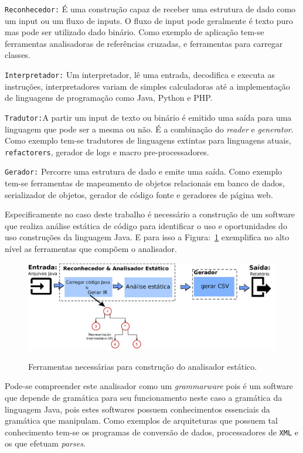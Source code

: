 \texttt{Reconhecedor:} É uma construç\~{a}o capaz de receber uma estrutura de dado como um input ou um fluxo de inputs. O fluxo de input pode geralmente \'{e} texto puro mas pode ser utilizado dado bin\'{a}rio. Como exemplo de aplicaç\~{a}o tem-se ferramentas analisadoras de referências cruzadas, e ferramentas para carregar classes.

\texttt{Interpretador:} Um interpretador, lê uma entrada, decodifica e executa as instruç\~{o}es, interpretadores variam de simples calculadoras at\'{e} a implementaç\~{a}o de linguagens de programaç\~{a}o como Java, Python e PHP.

\texttt{Tradutor:}A partir um input de texto ou bin\'{a}rio \'{e} emitido uma sa\'{i}da para uma linguagem que pode ser a mesma ou n\~{a}o. É a combinaç\~{a}o do \textit{reader} e \textit{generator}. Como exemplo tem-se tradutores de linguagens extintas para linguagens atuais, \texttt{refactorers},  gerador de logs e macro pre-processadores.
	
\texttt{Gerador:} Percorre uma estrutura de dado e emite uma sa\'{i}da. Como exemplo tem-se ferramentas de mapeamento de objetos relacionais em banco de dados, serializador de objetos, gerador de c\'{o}digo fonte e geradores de p\'{a}gina web.



Especificamente no caso deste trabalho \'{e} necess\'{a}rio a construç\~{a}o de um software que realiza an\'{a}lise est\'{a}tica de c\'{o}digo para identificar o uso e oportunidades do uso construç\~{o}es da linguagem Java. E para isso a Figura:~\ref{fig:stagesAnalyzer} exemplifica no alto n\'{i}vel as ferramentas que comp\~{o}em o analisador.

\begin{figure}[h]
	\center
	\includegraphics[scale=0.9]{Imagens/stagesAnalizer}
	\label{fig:stagesAnalyzer}
	\caption{Ferramentas necess\'{a}rias para construç\~{a}o do analisador est\'{a}tico.}
\end{figure}


Pode-se compreender este analisador como um {\it grammarware} pois \'{e} um software que depende de gram\'{a}tica para seu funcionamento neste caso a gram\'{a}tica da linguagem Java, pois estes softwares possuem conhecimentos essenciais da  gram\'{a}tica que manipulam. Como exemplos de arquiteturas que possuem tal conhecimento tem-se os programas de convers\~{a}o de dados, processadores de \texttt{XML} e os que efetuam \textit{parses}.

